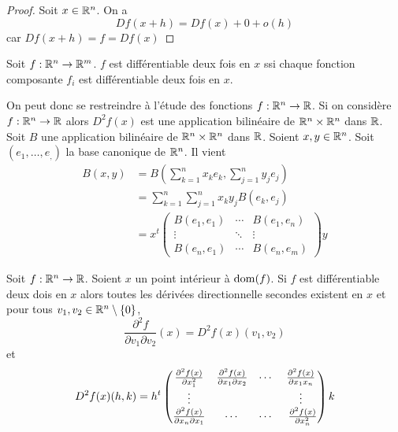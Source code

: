\begin{proof}
    Soit $x\in\mathbb{R}^n$. On a $$Df(x+h) = Df(x) + 0 + o(h)$$ car $Df(x+h) = f = Df(x)$
\end{proof}
\begin{proposition}
    Soit $f:\mathbb{R}^n\to\mathbb{R}^m$. $f$ est différentiable deux fois en $x$ ssi chaque fonction composante $f_i$ est différentiable deux fois en $x$.
\end{proposition}
On peut donc se restreindre à l'étude des fonctions $f: \mathbb{R}^n\to \mathbb{R}$. Si on considère $f:\mathbb{R}^n\to \mathbb{R}$ alors $D^2f(x)$ est une application bilinéaire de $\mathbb{R}^n\times \mathbb{R} ^ n$ dans $\mathbb{R}$. Soit $B$ une application bilinéaire de $\mathbb{R}^n\times \mathbb{R}^n$ dans $\mathbb{R}$. Soient $x,y\in\mathbb{R}^n$. Soit $(e_1,\dotsc,e_,)$ la base canonique de $\mathbb{R}^n$. Il vient  
\begin{align*}
    B(x,y)  &= B\left(\sum_{k = 1}^n x_ke_k, \sum_{j=1}^ny_je_j\right)\\
            &= \sum_{k = 1}^n \sum_{j=1}^nx_ky_jB\left( e_k,e_j\right)\\
            &= x^t \begin{pmatrix}
                B(e_1,e_1) & \cdots & B(e_1,e_n) \\
                \vdots & \ddots  & \vdots \\
                B(e_n,e_1) & \cdots & B(e_n,e_m)
            \end{pmatrix}y 
\end{align*}

\begin{theoreme}
    Soit $f: \mathbb{R} ^n \to \mathbb{R}$. Soient $x$ un point intérieur à $\operatorname{dom} (f)$. Si $f$ est différentiable deux dois en $x$ alors toutes les dérivées directionnelle secondes existent en $x$ et pour tous $v_1,v_2 \in \mathbb{R} ^n \setminus \{0\}$, $$ \frac{\partial^2f}{\partial v_1 \partial v_2}(x) = D^2f(x)(v_1,v_2)$$ et
\begin{align*}
    D^2f(x)(h,k )=h^t
    \begin{pmatrix}
        \frac{\partial ^2f(x)}{\partial x_1^2} &  \frac{\partial ^2f(x)}{\partial x_1\partial x_2} & \cdots &  \frac{\partial ^2f(x)}{\partial x_1x_n}\\
        \vdots & & & \vdots\\
         \frac{\partial ^2f(x)}{\partial x_n\partial x_1} & \cdots & \cdots & \ \frac{\partial ^2f(x)}{\partial x_n^2}    \end{pmatrix}k
\end{align*}
\end{theoreme}

